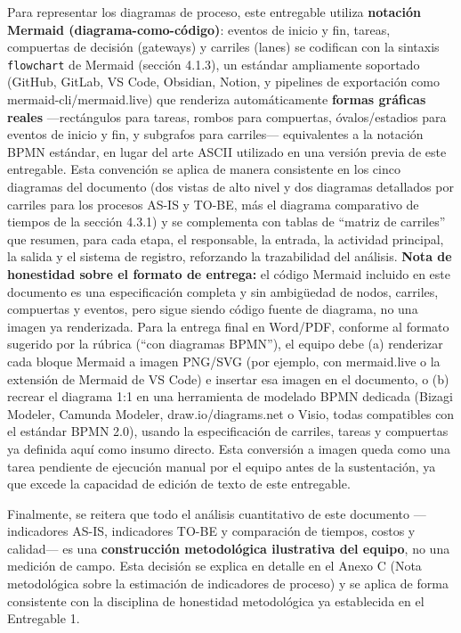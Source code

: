 \documentclass[11pt,a4paper]{article}
\begin{document}
Para representar los diagramas de proceso, este entregable utiliza \textbf{notación Mermaid (diagrama-como-código)}: eventos de inicio y fin, tareas, compuertas de decisión (gateways) y carriles (lanes) se codifican con la sintaxis \texttt{flowchart} de Mermaid (sección 4.1.3), un estándar ampliamente soportado (GitHub, GitLab, VS Code, Obsidian, Notion, y pipelines de exportación como mermaid-cli/mermaid.live) que renderiza automáticamente \textbf{formas gráficas reales} ---rectángulos para tareas, rombos para compuertas, óvalos/estadios para eventos de inicio y fin, y subgrafos para carriles--- equivalentes a la notación BPMN estándar, en lugar del arte ASCII utilizado en una versión previa de este entregable. Esta convención se aplica de manera consistente en los cinco diagramas del documento (dos vistas de alto nivel y dos diagramas detallados por carriles para los procesos AS-IS y TO-BE, más el diagrama comparativo de tiempos de la sección 4.3.1) y se complementa con tablas de ``matriz de carriles'' que resumen, para cada etapa, el responsable, la entrada, la actividad principal, la salida y el sistema de registro, reforzando la trazabilidad del análisis. \textbf{Nota de honestidad sobre el formato de entrega:} el código Mermaid incluido en este documento es una especificación completa y sin ambigüedad de nodos, carriles, compuertas y eventos, pero sigue siendo código fuente de diagrama, no una imagen ya renderizada. Para la entrega final en Word/PDF, conforme al formato sugerido por la rúbrica (``con diagramas BPMN''), el equipo debe (a) renderizar cada bloque Mermaid a imagen PNG/SVG (por ejemplo, con mermaid.live o la extensión de Mermaid de VS Code) e insertar esa imagen en el documento, o (b) recrear el diagrama 1:1 en una herramienta de modelado BPMN dedicada (Bizagi Modeler, Camunda Modeler, draw.io/diagrams.net o Visio, todas compatibles con el estándar BPMN 2.0), usando la especificación de carriles, tareas y compuertas ya definida aquí como insumo directo. Esta conversión a imagen queda como una tarea pendiente de ejecución manual por el equipo antes de la sustentación, ya que excede la capacidad de edición de texto de este entregable.

Finalmente, se reitera que todo el análisis cuantitativo de este documento ---indicadores AS-IS, indicadores TO-BE y comparación de tiempos, costos y calidad--- es una \textbf{construcción metodológica ilustrativa del equipo}, no una medición de campo. Esta decisión se explica en detalle en el Anexo C (Nota metodológica sobre la estimación de indicadores de proceso) y se aplica de forma consistente con la disciplina de honestidad metodológica ya establecida en el Entregable 1.
\end{document}
